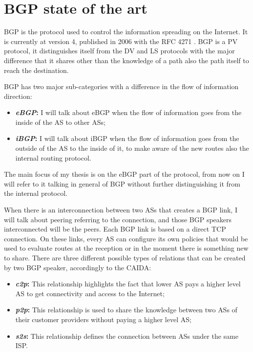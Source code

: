 \chapter{BGP state of the art}
\label{cha:bgp_art}

\ac{BGP} is the protocol used to control the information spreading on the Internet.
It is currently at version \num{4}, published in \num{2006} with the \ac{RFC} \num{4271}
\cite{rfc4271}.
\ac{BGP} is a \ac{PV} protocol, it distinguishes itself from the \ac{DV} and \ac{LS}
protocols with the major difference that it shares other than the knowledge of
a path also the path itself to reach the destination.

\ac{BGP} has two major sub-categories with a difference in the flow of information
direction:
\begin{itemize}
	\item \textbf{\textit{\ac{eBGP}}:} I will talk about \ac{eBGP} when the
		flow of information goes from the inside
		of the \ac{AS} to other \acp{AS};
	\item \textbf{\textit{\ac{iBGP}}:} I will talk about \ac{iBGP} when the flow
		of information goes from the outside of the \ac{AS} to the inside of
		it, to make aware of the new routes also the internal routing protocol.
\end{itemize}

The main focus of my thesis is on the \ac{eBGP} part of the protocol, from
now on I will refer to it talking in general of \ac{BGP} without further distinguishing
it from the internal protocol.

When there is an interconnection between two \acp{AS} that creates a \ac{BGP}
link, I will talk about peering referring to the connection, and those \ac{BGP}
speakers interconnected will be the peers.
Each \ac{BGP} link is based on a direct \ac{TCP} connection.
On these links, every \ac{AS} can configure its own policies that would be used
to evaluate routes at the reception or in the moment there is something new
to share.
There are three different possible types of relations that can be created by two
\ac{BGP} speaker, accordingly to the \ac{CAIDA}:

\begin{itemize}
	\item \textbf{\textit{\ac{c2p}}:} This relationship highlights the fact that
		lower \ac{AS} pays a higher level \ac{AS} to get connectivity and access
		to the Internet;
	\item \textbf{\textit{\ac{p2p}}:} This relationship is used to share the knowledge
		between two \acp{AS} of their customer providers without paying a higher
		level \ac{AS};
	\item \textbf{\textit{\ac{s2s}}:} This relationship defines the connection
		between \acp{AS} under the same \ac{ISP}.
\end{itemize}


